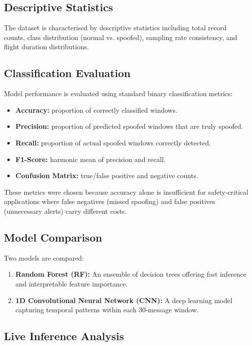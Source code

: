 \documentclass[11pt,a4paper]{article}
\begin{document}
\subsection{Descriptive Statistics}

The dataset is characterised by descriptive statistics including total record counts, class distribution (normal vs. spoofed), sampling rate consistency, and flight duration distributions.

\subsection{Classification Evaluation}

Model performance is evaluated using standard binary classification metrics:
\begin{itemize}
    \item \textbf{Accuracy:} proportion of correctly classified windows.
    \item \textbf{Precision:} proportion of predicted spoofed windows that are truly spoofed.
    \item \textbf{Recall:} proportion of actual spoofed windows correctly detected.
    \item \textbf{F1-Score:} harmonic mean of precision and recall.
    \item \textbf{Confusion Matrix:} true/false positive and negative counts.
\end{itemize}

These metrics were chosen because accuracy alone is insufficient for safety-critical applications where false negatives (missed spoofing) and false positives (unnecessary alerts) carry different costs.

\subsection{Model Comparison}

Two models are compared:
\begin{enumerate}
    \item \textbf{Random Forest (RF):} An ensemble of decision trees offering fast inference and interpretable feature importance.
    \item \textbf{1D Convolutional Neural Network (CNN):} A deep learning model capturing temporal patterns within each 30-message window.
\end{enumerate}

\subsection{Live Inference Analysis}
\end{document}
